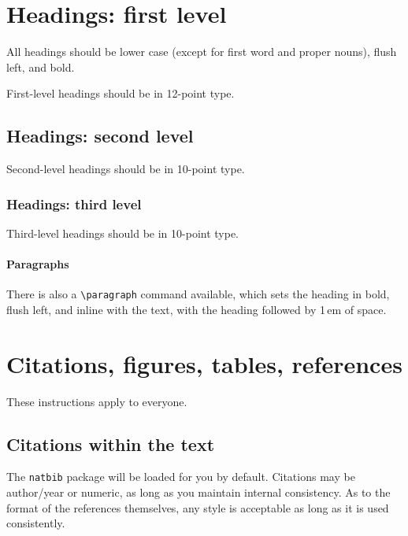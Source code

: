 \documentclass{article}
\begin{document}
\section{Headings: first level}
\label{headings}

All headings should be lower case (except for first word and proper nouns),
flush left, and bold.

First-level headings should be in 12-point type.

\subsection{Headings: second level}

Second-level headings should be in 10-point type.

\subsubsection{Headings: third level}

Third-level headings should be in 10-point type.

\paragraph{Paragraphs}

There is also a \verb+\paragraph+ command available, which sets the heading in
bold, flush left, and inline with the text, with the heading followed by 1\,em
of space.

\section{Citations, figures, tables, references}
\label{others}

These instructions apply to everyone.

\subsection{Citations within the text}

The \verb+natbib+ package will be loaded for you by default.  Citations may be
author/year or numeric, as long as you maintain internal consistency.  As to the
format of the references themselves, any style is acceptable as long as it is
used consistently.
\end{document}
